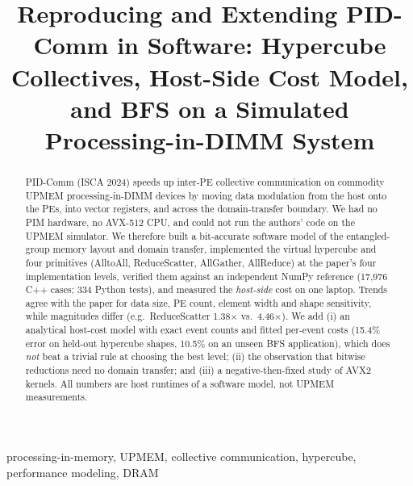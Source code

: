 \documentclass[conference]{IEEEtran}
\begin{document}
\title{Reproducing and Extending PID-Comm in Software: Hypercube Collectives, Host-Side Cost Model, and BFS on a Simulated Processing-in-DIMM System}

\author{
\and
{}
\and
{}
}

\maketitle

\begin{abstract}
PID-Comm (ISCA 2024) speeds up inter-PE collective communication on commodity UPMEM processing-in-DIMM devices by moving data modulation from the host onto the PEs, into vector registers, and across the domain-transfer boundary. We had no PIM hardware, no AVX-512 CPU, and could not run the authors' code on the UPMEM simulator. We therefore built a bit-accurate software model of the entangled-group memory layout and domain transfer, implemented the virtual hypercube and four primitives (AlltoAll, ReduceScatter, AllGather, AllReduce) at the paper's four implementation levels, verified them against an independent NumPy reference (17{,}976 C++ cases; 334 Python tests), and measured the \emph{host-side} cost on one laptop. Trends agree with the paper for data size, PE count, element width and shape sensitivity, while magnitudes differ (e.g.\ ReduceScatter 1.38$\times$ vs.\ 4.46$\times$). We add (i) an analytical host-cost model with exact event counts and fitted per-event costs (15.4\% error on held-out hypercube shapes, 10.5\% on an unseen BFS application), which does \emph{not} beat a trivial rule at choosing the best level; (ii) the observation that bitwise reductions need no domain transfer; and (iii) a negative-then-fixed study of AVX2 kernels. All numbers are host runtimes of a software model, not UPMEM measurements.
\end{abstract}

\begin{IEEEkeywords}
processing-in-memory, UPMEM, collective communication, hypercube, performance modeling, DRAM
\end{IEEEkeywords}
\end{document}

